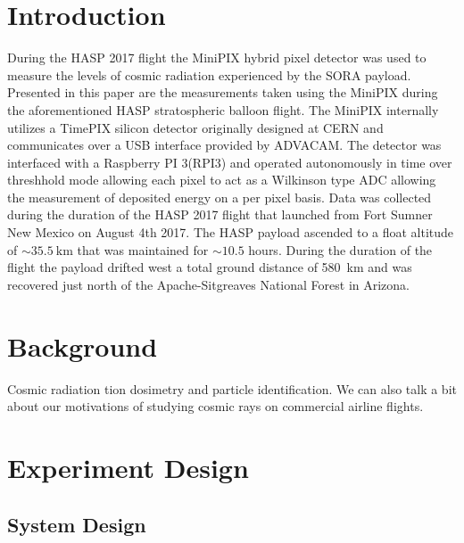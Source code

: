 \documentclass[final,1p, times, twocolumn]{elsarticle}
\begin{document}
\linenumbers

\section{Introduction}
\label{Introduction}
During the HASP 2017\cite{hasp} flight the MiniPIX hybrid pixel detector\cite{minipix} was used to measure the levels of cosmic radiation experienced by the SORA payload\cite{sora}. Presented in this paper are the measurements taken using the MiniPIX during the aforementioned HASP stratospheric balloon flight. The MiniPIX internally utilizes a TimePIX silicon detector originally designed at CERN\cite{cern} and communicates over a USB interface provided by ADVACAM\cite{advacam}. The detector was interfaced with a Raspberry PI 3(RPI3) and operated autonomously in time over threshhold mode allowing each pixel to act as a Wilkinson type ADC allowing the measurement of deposited energy on a per pixel basis. Data was collected during the duration of the HASP 2017 flight that launched from Fort Sumner New Mexico on August 4th 2017. The HASP payload ascended to a float altitude of $\sim{}\SI{35.5}{\kilo\meter}$ that was maintained for $\sim{}10.5$ hours. During the duration of the flight the payload drifted west a total ground distance of \SI{580}{\kilo\meter} and was recovered just north of the Apache-Sitgreaves National Forest in Arizona.


\section{Background}
\label{Background}
Cosmic radiation 
tion dosimetry and particle identification. We can also talk a bit about our motivations of studying cosmic rays on commercial airline flights.

\section{Experiment Design}
\label{Experiment Design}

\subsection{System Design}
\end{document}
